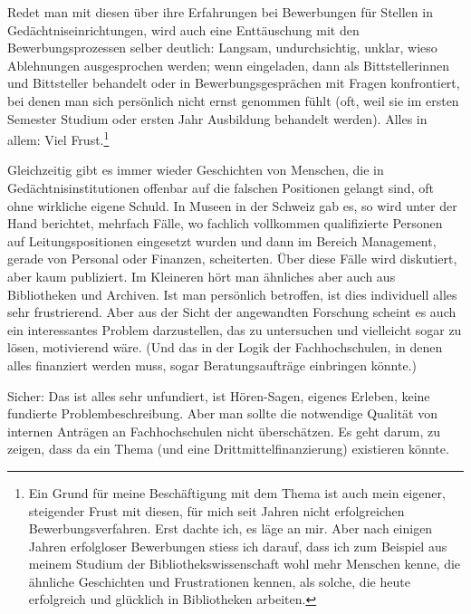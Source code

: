 \documentclass[a4paper,
fontsize=11pt,
oneside,
numbers=noperiodatend,
parskip=half-,
bibliography=totoc,
final
]{scrartcl}
\begin{document}
Redet man mit diesen über ihre Erfahrungen bei Bewerbungen für Stellen
in Gedächtniseinrichtungen, wird auch eine Enttäuschung mit den
Bewerbungsprozessen selber deutlich: Langsam, undurchsichtig, unklar,
wieso Ablehnungen ausgesprochen werden; wenn eingeladen, dann als
Bittstellerinnen und Bittsteller behandelt oder in Bewerbungsgesprächen
mit Fragen konfrontiert, bei denen man sich persönlich nicht ernst
genommen fühlt (oft, weil sie im ersten Semester Studium oder ersten
Jahr Ausbildung behandelt werden). Alles in allem: Viel Frust.\footnote{Ein
  Grund für meine Beschäftigung mit dem Thema ist auch mein eigener,
  steigender Frust mit diesen, für mich seit Jahren nicht erfolgreichen
  Bewerbungsverfahren. Erst dachte ich, es läge an mir. Aber nach
  einigen Jahren erfolgloser Bewerbungen stiess ich darauf, dass ich zum
  Beispiel aus meinem Studium der Bibliothekswissenschaft wohl mehr
  Menschen kenne, die ähnliche Geschichten und Frustrationen kennen, als
  solche, die heute erfolgreich und glücklich in Bibliotheken arbeiten.}

Gleichzeitig gibt es immer wieder Geschichten von Menschen, die in
Gedächtnisinstitutionen offenbar auf die falschen Positionen gelangt
sind, oft ohne wirkliche eigene Schuld. In Museen in der Schweiz gab es,
so wird unter der Hand berichtet, mehrfach Fälle, wo fachlich vollkommen
qualifizierte Personen auf Leitungspositionen eingesetzt wurden und dann
im Bereich Management, gerade von Personal oder Finanzen, scheiterten.
Über diese Fälle wird diskutiert, aber kaum publiziert. Im Kleineren
hört man ähnliches aber auch aus Bibliotheken und Archiven. Ist man
persönlich betroffen, ist dies individuell alles sehr frustrierend. Aber
aus der Sicht der angewandten Forschung scheint es auch ein
interessantes Problem darzustellen, das zu untersuchen und vielleicht
sogar zu lösen, motivierend wäre. (Und das in der Logik der
Fachhochschulen, in denen alles finanziert werden muss, sogar
Beratungsaufträge einbringen könnte.)

Sicher: Das ist alles sehr unfundiert, ist Hören-Sagen, eigenes Erleben,
keine fundierte Problembeschreibung. Aber man sollte die notwendige
Qualität von internen Anträgen an Fachhochschulen nicht überschätzen. Es
geht darum, zu zeigen, dass da ein Thema (und eine
Drittmittelfinanzierung) existieren könnte.
\end{document}
